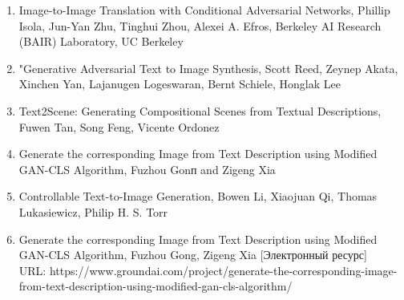 \documentclass{article}
\begin{document}
\begin{enumerate}
 : Википедия. Свободная энциклопедия.\\
    \indent URL: https://en.wikipedia.org/wiki/Gated\_recurrent\_unit
    \item Image-to-Image Translation with Conditional Adversarial Networks, Phillip Isola, Jun-Yan Zhu, Tinghui Zhou, Alexei A. Efros, Berkeley AI Research (BAIR) Laboratory, UC Berkeley
    \item "Generative Adversarial Text to Image Synthesis, Scott Reed, Zeynep Akata, Xinchen Yan, Lajanugen Logeswaran, Bernt Schiele, Honglak Lee
    \item Text2Scene: Generating Compositional Scenes from Textual Descriptions, Fuwen Tan, Song Feng, Vicente Ordonez 
    \item Generate the corresponding Image from Text Description using Modified GAN-CLS Algorithm, Fuzhou Gonп and Zigeng Xia
    \item Controllable Text-to-Image Generation, Bowen Li, Xiaojuan Qi, Thomas Lukasiewicz, Philip H. S. Torr
    \item Generate the corresponding Image from Text Description using Modified GAN-CLS Algorithm, Fuzhou Gong, Zigeng Xia [Электронный ресурс]\\
    \indent URL: https://www.groundai.com/project/generate-the-corresponding-image-from-text-description-using-modified-gan-cls-algorithm/
    \end{enumerate}
    
\end{document}
